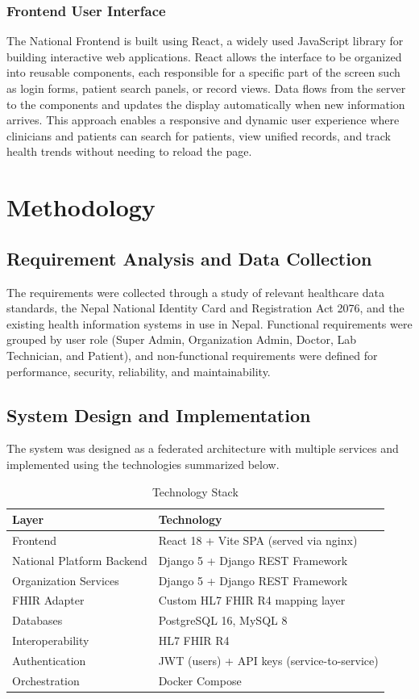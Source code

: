 \documentclass[12pt]{report}
\numberwithin{equation}{chapter}
\begin{document}
\subsection{Frontend User Interface}
The National Frontend is built using React, a widely used JavaScript library for building interactive web applications. React allows the interface to be organized into reusable components, each responsible for a specific part of the screen such as login forms, patient search panels, or record views. Data flows from the server to the components and updates the display automatically when new information arrives. This approach enables a responsive and dynamic user experience where clinicians and patients can search for patients, view unified records, and track health trends without needing to reload the page.

\chapter{Methodology}

\section{Requirement Analysis and Data Collection}
The requirements were collected through a study of relevant healthcare data standards, the Nepal National Identity Card and Registration Act 2076, and the existing health information systems in use in Nepal. Functional requirements were grouped by user role (Super Admin, Organization Admin, Doctor, Lab Technician, and Patient), and non-functional requirements were defined for performance, security, reliability, and maintainability. 

\section{System Design and Implementation}
The system was designed as a federated architecture with multiple services and implemented using the technologies summarized below.

\begin{table}[H]
\centering
\caption{Technology Stack}
\label{tab:techstack}
\begin{tabular}{|l|l|}
\hline
\textbf{Layer} & \textbf{Technology} \\ \hline
Frontend & React 18 + Vite SPA (served via nginx) \\
National Platform Backend & Django 5 + Django REST Framework \\
Organization Services & Django 5 + Django REST Framework \\
FHIR Adapter & Custom HL7 FHIR R4 mapping layer \\
Databases & PostgreSQL 16, MySQL 8 \\
Interoperability & HL7 FHIR R4 \\
Authentication & JWT (users) + API keys (service-to-service) \\
Orchestration & Docker Compose \\ \hline
\end{tabular}
\end{table}
\end{document}
